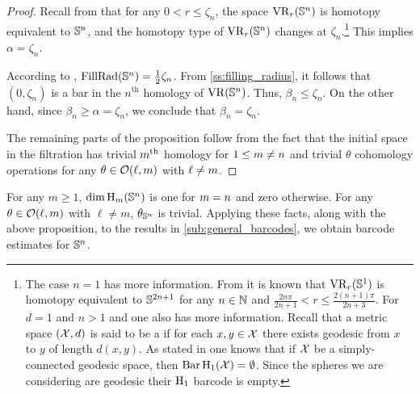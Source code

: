 \begin{proof}
        Recall from \cite[Thm.~7.1]{lim2020vietoris} that for any $0 < r \leq \zeta_n$, the space $\operatorname{VR}_r(\mathbb{S}^n)$ is homotopy equivalent to $\mathbb{S}^n$, and the homotopy type of $\operatorname{VR}_r(\mathbb{S}^n)$ changes at $\zeta_n$.\footnote{
    	The case $n = 1$ has more information.
    	From \cite[Thm.~7.4]{adamaszek2017vietoris} it is known that $\operatorname{VR}_r(\mathbb{S}^1)$ is homotopy equivalent to $\mathbb{S}^{2n+1}$ for any $n \in \mathbb{N}$ and $\frac{2n\pi}{2n+1} < r \leq \frac{2(n+1)\pi}{2n+3}$.
    	For $d=1$ and $n > 1$ and one also has more information.
    	Recall that a metric space $(\mathcal{X}, d)$ is said to be a  if for each $x, y \in \mathcal{X}$ there exists geodesic from $x$ to $y$ of length $d(x, y)$.
    	As stated in \cite[Prop.~7.10]{virk20201} one knows that if $\mathcal{X}$ be a simply-connected geodesic space, then $\operatorname{Bar}\mathrm{H}_1(\mathcal{X}) = \emptyset$.
    	Since the spheres we are considering are geodesic their $\mathrm{H}_1$ barcode is empty.}
        This implies $\alpha=\zeta_n$.
        
        According to \cite{katz1983filling}, \(\mathrm{FillRad}(\mathbb{S}^n) = \frac{1}{2}\zeta_n\). 
        From \cref{ss:filling_radius}, it follows that \((0, \zeta_n)\) is a bar in the \(n^{\text{th}}\) homology of \(\operatorname{VR} (\mathbb{S}^n)\). 
        Thus, \(\beta_n \leq \zeta_n\). 
        On the other hand, since \(\beta_n \geq \alpha = \zeta_n\), we conclude that \(\beta_n = \zeta_n\).

        The remaining parts of the proposition follow from the fact that the initial space in the filtration has trivial $m^{\mathrm{th}}$ homology for $1\leq m \neq n$ and trivial $\theta$ cohomology operations for any \(\theta \in \mathcal{O}(\ell,m)\) with \(\ell \neq m\).
\end{proof}

For any \(m \geq 1\), \(\dim \operatorname{H}_m(\mathbb{S}^n)\) is one for \(m = n\) and zero otherwise. 
For any \(\theta \in \mathcal{O}(\ell, m)\) with \(\ell \neq m\), \(\theta_{\mathbb{S}^n}\) is trivial. 
Applying these facts, along with the above proposition, to the results in \cref{sub:general_barcodes}, we obtain barcode estimates for \(\mathbb{S}^n\).


